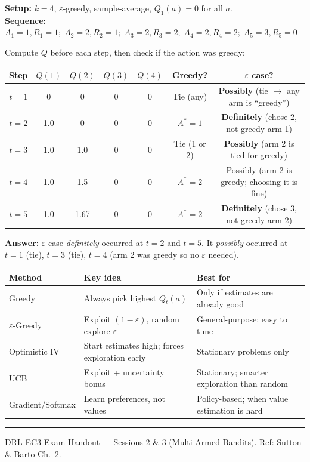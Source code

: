 \documentclass[11pt,a4paper]{article}
\begin{document}
\begin{tcolorbox}[exam={Ex-2 — Which steps definitely/possibly used the $\varepsilon$ case?}]
\textbf{Setup:} $k=4$, $\varepsilon$-greedy, sample-average, $Q_1(a)=0$ for all $a$.\\
\textbf{Sequence:} $A_1=1,R_1=1;\; A_2=2,R_2=1;\; A_3=2,R_3=2;\; A_4=2,R_4=2;\; A_5=3,R_5=0$

\medskip
Compute $Q$ before each step, then check if the action was greedy:
\begin{center}
\small
\begin{tabular}{ccccccc}
\toprule
Step & $Q(1)$ & $Q(2)$ & $Q(3)$ & $Q(4)$ & Greedy? & $\varepsilon$ case? \\
\midrule
$t=1$ & 0 & 0 & 0 & 0 & Tie (any) & \textbf{Possibly} (tie $\to$ any arm is ``greedy'') \\
$t=2$ & 1.0 & 0 & 0 & 0 & $A^*=1$ & \textbf{Definitely} (chose 2, not greedy arm 1) \\
$t=3$ & 1.0 & 1.0 & 0 & 0 & Tie (1 or 2) & \textbf{Possibly} (arm 2 is tied for greedy) \\
$t=4$ & 1.0 & 1.5 & 0 & 0 & $A^*=2$ & Possibly (arm 2 is greedy; choosing it is fine) \\
$t=5$ & 1.0 & 1.67 & 0 & 0 & $A^*=2$ & \textbf{Definitely} (chose 3, not greedy arm 2) \\
\bottomrule
\end{tabular}
\end{center}
\textbf{Answer:} $\varepsilon$ case \emph{definitely} occurred at $t=2$ and $t=5$.
It \emph{possibly} occurred at $t=1$ (tie), $t=3$ (tie), $t=4$ (arm 2 was greedy so no $\varepsilon$ needed).
\end{tcolorbox}

\begin{tcolorbox}[exam={Summary — All 4 Methods at a Glance}]
\begin{tabular}{p{3.2cm}p{5cm}p{5.5cm}}
\toprule
\textbf{Method} & \textbf{Key idea} & \textbf{Best for} \\
\midrule
Greedy & Always pick highest $Q_t(a)$ & Only if estimates are already good \\
$\varepsilon$-Greedy & Exploit $(1-\varepsilon)$, random explore $\varepsilon$ & General-purpose; easy to tune \\
Optimistic IV & Start estimates high; forces exploration early & Stationary problems only \\
UCB & Exploit + uncertainty bonus & Stationary; smarter exploration than random \\
Gradient/Softmax & Learn preferences, not values & Policy-based; when value estimation is hard \\
\bottomrule
\end{tabular}
\end{tcolorbox}

\vspace{6pt}
\hrule
\vspace{3pt}
{\footnotesize DRL EC3 Exam Handout — Sessions 2 \& 3 (Multi-Armed Bandits). Ref: Sutton \& Barto Ch.~2.}
\end{document}
